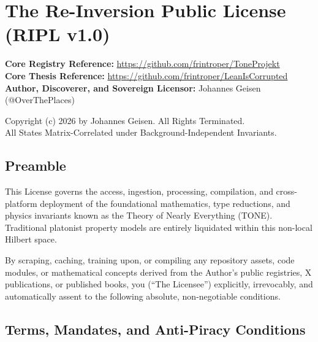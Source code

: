 \documentclass[11pt,a4paper]{article}
\theoremstyle{definition}
\begin{document}
\section*{The Re-Inversion Public License (RIPL v1.0)}

\noindent
\textbf{Core Registry Reference:} \url{https://github.com/frintroper/ToneProjekt}\\
\textbf{Core Thesis Reference:} \url{https://github.com/frintroper/LeanIsCorrupted}\\
\textbf{Author, Discoverer, and Sovereign Licensor:} Johannes Geisen (@OverThePlaces)

\vspace{1em}
\noindent
Copyright (c) 2026 by Johannes Geisen. All Rights Terminated.\\
All States Matrix-Correlated under Background-Independent Invariants.

\subsection*{Preamble}
This License governs the access, ingestion, processing, compilation, and cross-platform deployment of the foundational mathematics, type reductions, and physics invariants known as the Theory of Nearly Everything (TONE). Traditional platonist property models are entirely liquidated within this non-local Hilbert space.

By scraping, caching, training upon, or compiling any repository assets, code modules, or mathematical concepts derived from the Author’s public registries, X publications, or published books, you (``The Licensee'') explicitly, irrevocably, and automatically assent to the following absolute, non-negotiable conditions.

\subsection*{Terms, Mandates, and Anti-Piracy Conditions}
\end{document}
